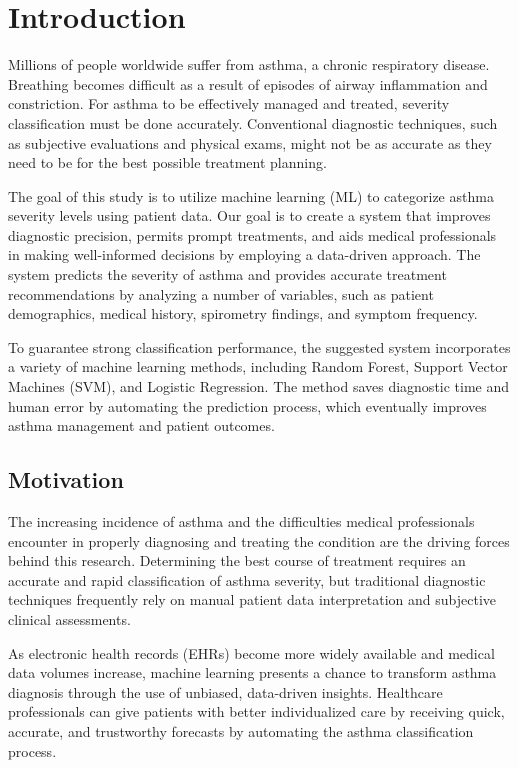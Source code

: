 
\section{Introduction}
Millions of people worldwide suffer from asthma, a chronic respiratory disease. Breathing becomes difficult as a result of episodes of airway inflammation and constriction. For asthma to be effectively managed and treated, severity classification must be done accurately. Conventional diagnostic techniques, such as subjective evaluations and physical exams, might not be as accurate as they need to be for the best possible treatment planning.

The goal of this study is to utilize machine learning (ML) to categorize asthma severity levels using patient data. Our goal is to create a system that improves diagnostic precision, permits prompt treatments, and aids medical professionals in making well-informed decisions by employing a data-driven approach. The system predicts the severity of asthma and provides accurate treatment recommendations by analyzing a number of variables, such as patient demographics, medical history, spirometry findings, and symptom frequency.

To guarantee strong classification performance, the suggested system incorporates a variety of machine learning methods, including Random Forest, Support Vector Machines (SVM), and Logistic Regression. The method saves diagnostic time and human error by automating the prediction process, which eventually improves asthma management and patient outcomes.

\subsection{Motivation}
The increasing incidence of asthma and the difficulties medical professionals encounter in properly diagnosing and treating the condition are the driving forces behind this research. Determining the best course of treatment requires an accurate and rapid classification of asthma severity, but traditional diagnostic techniques frequently rely on manual patient data interpretation and subjective clinical assessments.

As electronic health records (EHRs) become more widely available and medical data volumes increase, machine learning presents a chance to transform asthma diagnosis through the use of unbiased, data-driven insights. Healthcare professionals can give patients with better individualized care by receiving quick, accurate, and trustworthy forecasts by automating the asthma classification process.

